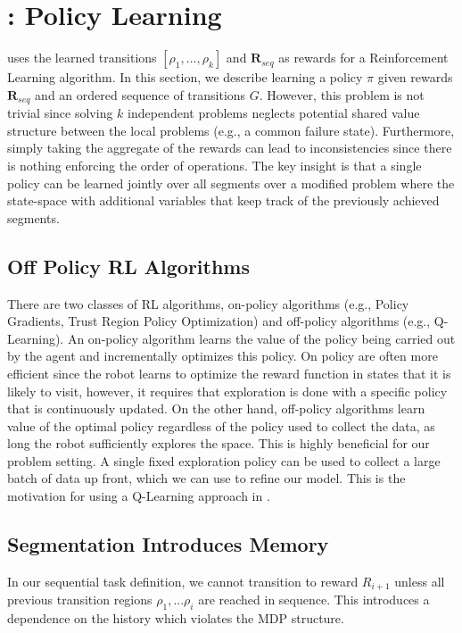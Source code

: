 \section{\hirl: Policy Learning}
 \hirl uses the learned transitions $[\rho_1,...,\rho_k]$ and $\mathbf{R}_{seq}$ as rewards for a Reinforcement Learning algorithm. In this section, we describe learning a policy $\pi$ given rewards $\mathbf{R}_{seq}$ and an ordered sequence of transitions $G$.
However, this problem is not trivial since solving $k$ independent problems neglects potential shared value structure between the local problems (e.g., a common failure state).
Furthermore, simply taking the aggregate of the rewards can lead to inconsistencies since there is nothing enforcing the order of operations.
The key insight is that a single policy can be learned jointly over all segments over a modified problem where the state-space with additional variables that keep track of the previously achieved segments.

\subsection{Off Policy RL Algorithms}
There are two classes of RL algorithms, on-policy algorithms (e.g., Policy Gradients, Trust Region Policy Optimization) and off-policy algorithms (e.g., Q-Learning). An on-policy algorithm learns the value of the policy being carried out by the agent and incrementally optimizes this policy. On policy are often more efficient since the robot learns to optimize the reward function in states that it is likely to visit, however, it requires that exploration is done with a specific policy that is continuously updated.
On the other hand, off-policy algorithms learn value of the optimal policy regardless of the policy used to collect the data, as long the robot sufficiently explores the space.
This is highly beneficial for our problem setting.
A single fixed exploration policy can be used to collect a large batch of data up front, which we can use to refine our model.
This is the motivation for using a Q-Learning approach in \hirl.

\subsection{Segmentation Introduces Memory}
In our sequential task definition, we cannot transition to reward $R_{i+1}$ unless all previous transition regions $\rho_{1},...\rho_{i}$ are reached in sequence.
This introduces a dependence on the history which violates the MDP structure.

